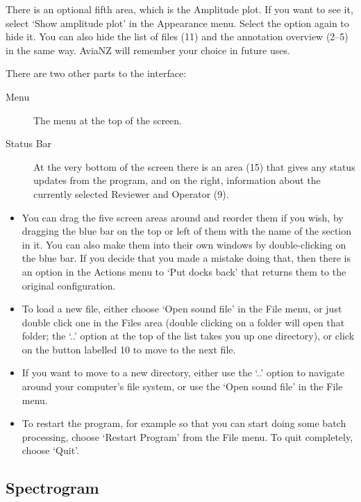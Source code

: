 \documentclass{article}
\begin{document}
There is an optional fifth area, which is the Amplitude plot. If you want to see it, select `Show amplitude plot' in the Appearance menu. Select the option again to hide it. You can also hide the list of files (11) and the annotation overview (2--5) in the same way. AviaNZ will remember your choice in future uses.

There are two other parts to the interface:
	\begin{description}
	\item[Menu] The menu at the top of the screen. 
	\item[Status Bar] At the very bottom of the screen there is an area (15) that gives any status updates from the program, and on the right, information about the currently selected Reviewer and Operator (9).
	\end{description}

\begin{itemize}
\item You can drag the five screen areas around and reorder them if you wish, by dragging the blue bar on the top or left of them with the name of the section in it. You can also make them into their own windows by double-clicking on the blue bar. If you decide that you made a mistake doing that, then there is an option in the Actions menu to `Put docks back' that returns them to the original configuration.

\item To load a new file, either choose `Open sound file' in the File menu, or just double click one in the Files area (double clicking on a folder will open that folder; the `..' option at the top of the list takes you up one directory), or click on the button labelled 10 to move to the next file.

\item If you want to move to a new directory, either use the `..' option to navigate around your computer's file system, or use the  `Open sound file' in the File menu.

\item To restart the program, for example so that you can start doing some batch processing, choose `Restart Program' from the File menu. To quit completely, choose `Quit'. 
\end{itemize}

\subsection{Spectrogram}\label{sec:spectrogram}
\end{document}
